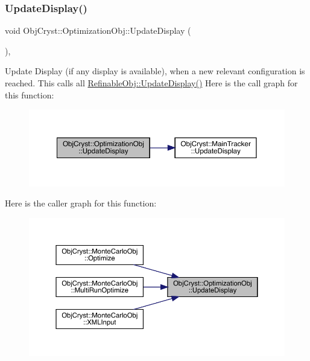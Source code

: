 \subsubsection{\texorpdfstring{UpdateDisplay()}{UpdateDisplay()}}
{\footnotesize\ttfamily void Obj\+Cryst\+::\+Optimization\+Obj\+::\+Update\+Display (\begin{DoxyParamCaption}{ }\end{DoxyParamCaption})\hspace{0.3cm}{\ttfamily [protected]}, {\ttfamily [virtual]}}

Update Display (if any display is available), when a new \textquotesingle{}relevant\textquotesingle{} configuration is reached. This calls all \mbox{\hyperlink{class_obj_cryst_1_1_refinable_obj_ac3164266424f984c8322f614c986f671}{Refinable\+Obj\+::\+Update\+Display()}} Here is the call graph for this function\+:
\nopagebreak
\begin{figure}[H]
\begin{center}
\leavevmode
\includegraphics[width=350pt]{class_obj_cryst_1_1_optimization_obj_a6c353da1d31c049c2ad08a5503d5380b_cgraph}
\end{center}
\end{figure}
Here is the caller graph for this function\+:
\nopagebreak
\begin{figure}[H]
\begin{center}
\leavevmode
\includegraphics[width=350pt]{class_obj_cryst_1_1_optimization_obj_a6c353da1d31c049c2ad08a5503d5380b_icgraph}
\end{center}
\end{figure}
\mbox{\label{class_obj_cryst_1_1_optimization_obj_aa07aee60f56780e2c56fb20f4a5f48a8}} 
